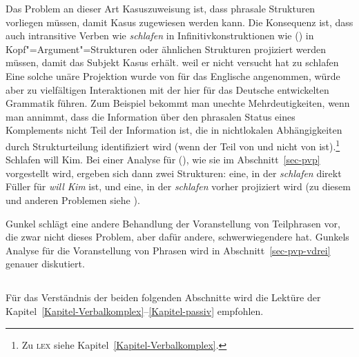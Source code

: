 Das Problem an dieser Art Kasuszuweisung ist, dass phrasale Strukturen vorliegen müssen,
damit Kasus zugewiesen werden kann. Die Konsequenz ist, dass auch intransitive Verben wie \emph{schlafen}
in Infinitivkonstruktionen wie () in Kopf"=Argument"=Strukturen oder ähnlichen Strukturen
projiziert werden müssen, damit das Subjekt Kasus erhält.
\ea
weil er nicht versucht hat zu schlafen
\z
Eine solche unäre Projektion wurde von \citet*[, Fn. 32]{ps2} für das Englische
angenommen, würde aber zu vielfältigen Interaktionen mit der hier für das Deutsche
entwickelten Grammatik führen. Zum Beispiel bekommt man unechte Mehrdeutigkeiten,
wenn man annimmt, dass die Information über den phrasalen Status eines Komplements 
nicht Teil der Information ist, die in nichtlokalen Abhängigkeiten durch Strukturteilung
identifiziert wird (wenn der \lexw{} Teil von \synsem und nicht von \HPSGloc ist).\footnote{
  Zu \textsc{lex} siehe Kapitel~\ref{Kapitel-Verbalkomplex}.%
}
\ea
Schlafen will Kim.
\z
Bei einer Analyse für (), wie sie im Abschnitt~\ref{sec-pvp} vorgestellt wird, ergeben
sich dann zwei Strukturen: eine, in der \emph{schlafen} direkt Füller für \emph{will Kim}
ist, und eine, in der \emph{schlafen} vorher projiziert wird (zu diesem und anderen Problemen siehe
).

Gunkel schlägt eine andere Behandlung der Voranstellung von Teilphrasen vor, die
zwar nicht dieses Problem, aber dafür andere, schwerwiegendere hat. Gunkels Analyse
für die Voranstellung von Phrasen wird in Abschnitt~\ref{sec-pvp-vdrei} genauer diskutiert.






\subsection{}
\label{kasus-adamp}

Für das Verständnis der beiden folgenden Abschnitte wird die Lektüre
der Kapitel~\ref{Kapitel-Verbalkomplex}--\ref{Kapitel-passiv} empfohlen.
\largerpage[2]


